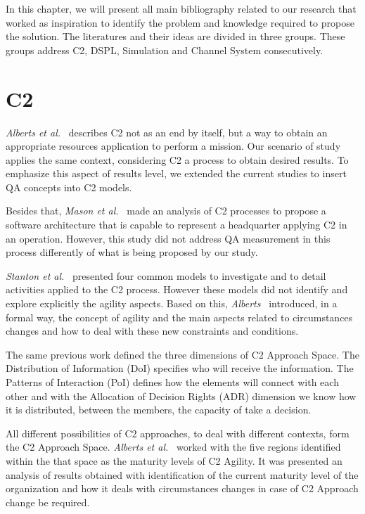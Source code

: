 In this chapter, we will present all main bibliography related to our research that worked as inspiration to identify the problem and knowledge required to propose the solution. The literatures and their ideas are divided in three groups. These groups address C2, DSPL, Simulation and Channel System consecutively.

\section{C2}

\textit{Alberts et al.}~\cite{Alberts2006} describes C2 not as an end by itself, but a way to obtain an appropriate resources application to perform a mission. Our scenario of study applies the same context, considering C2 a process to obtain desired results. To emphasize this aspect of results level, we extended the current studies to insert QA concepts into C2 models.

Besides that, \textit{Mason et al.}~\cite{Mason2001} made an analysis of C2 processes to propose a software architecture that is capable to represent a headquarter applying C2 in an operation. However, this study did not address QA measurement in this process differently of what is being proposed by our study.

\textit{Stanton et al.}~\cite{Stanton2007} presented four common models to investigate and to detail activities applied to the C2 process. However these models did not identify and explore explicitly the agility aspects. Based on this, \textit{Alberts}~\cite{Alberts10} introduced, in a formal way, the concept of agility and the main aspects related to circumstances changes and how to deal with these new constraints and conditions.

The same previous work \cite{Alberts2006} defined the three dimensions of C2 Approach Space. The Distribution of Information (DoI) specifies who will receive the information. The Patterns of Interaction (PoI) defines how the elements will connect with each other and with the Allocation of Decision Rights (ADR) dimension we know how it is distributed, between the members, the capacity of take a decision. 

All different possibilities of C2 approaches, to deal with different contexts, form the C2 Approach Space. \textit{Alberts et al.}~\cite{nato01} worked with the five regions identified within the that space as the maturity levels of C2 Agility. It was presented an analysis of results obtained with identification of the current maturity level of the organization and how it deals with circumstances changes in case of C2 Approach change be required.

